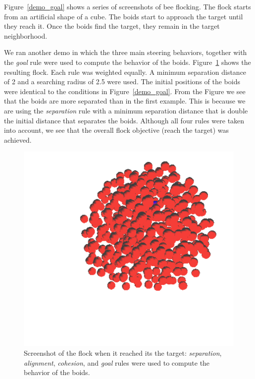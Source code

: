 Figure~\ref{demo_goal} shows a series of screenshots of bee flocking. The flock starts from an artificial shape of a cube. The boids start to approach the target until they reach it. Once the boids find the target, they remain in the target neighborhood. 

We ran another demo in which the three main steering behaviors, together with the \textit{goal} rule were used to compute the behavior of the boids. Figure~\ref{goal_4rules} shows the resulting flock. Each rule was weighted equally. A minimum separation distance of 2 and a searching radius of 2.5 were used. The initial positions of the boids were identical to the conditions in Figure~\ref{demo_goal}. From the Figure we see that the boids are more separated than in the first example. This is because we are using the \textit{separation} rule with a minimum separation distance that is double the initial distance that separates the boids. Although all four rules were taken into account, we see that the overall flock objective (reach the target) was achieved. 

\begin{figure}[htbp]
\begin{center}
\includegraphics[scale=0.35]{figures/demo_goal_4rules.pdf}
\caption{Screenshot of the flock when it reached its the target: \textit{separation}, \textit{alignment}, \textit{cohesion}, and \textit{goal} rules were used to compute the behavior of the boids.}
\label{goal_4rules}
\end{center}
\end{figure}

